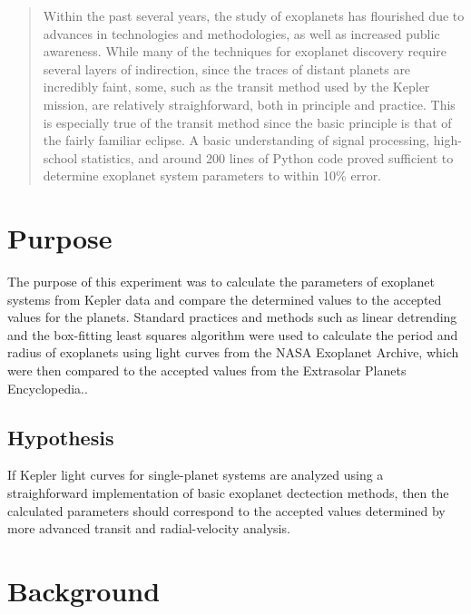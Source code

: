 \documentclass{report}
\begin{document}
\maketitle
\tableofcontents

\begin{abstract}
    Within the past several years, the study of exoplanets has flourished due to advances in technologies and methodologies, as well as increased public awareness.
    While many of the techniques for exoplanet discovery require several layers of indirection, since the traces of distant planets are incredibly faint, some, such as
    the transit method used by the Kepler mission, are relatively straighforward, both in principle and practice. This is especially true of the transit method since the
    basic principle is that of the fairly familiar eclipse. A basic understanding of signal processing, high-school statistics, and around 200 lines of Python code
    proved sufficient to determine exoplanet system parameters to within 10\% error.
\end{abstract}

\section{Purpose}

The purpose of this experiment was to calculate the parameters of exoplanet systems from Kepler data and compare the determined values to the accepted
values for the planets. Standard practices and methods such as linear detrending and the box-fitting least squares algorithm were used to calculate the
period and radius of exoplanets using light curves from the NASA Exoplanet Archive, which were then compared to the accepted values from the Extrasolar
Planets Encyclopedia.\autocite{exoplanetEncyclopedia, exoplanetArchive}.

\subsection{Hypothesis}
If Kepler light curves for single-planet systems are analyzed using a straighforward implementation of basic exoplanet dectection methods, then
the calculated parameters should correspond to the accepted values determined by more advanced transit and radial-velocity analysis.

\section{Background}





\nocite{*}
\printbibliography
\end{document}
